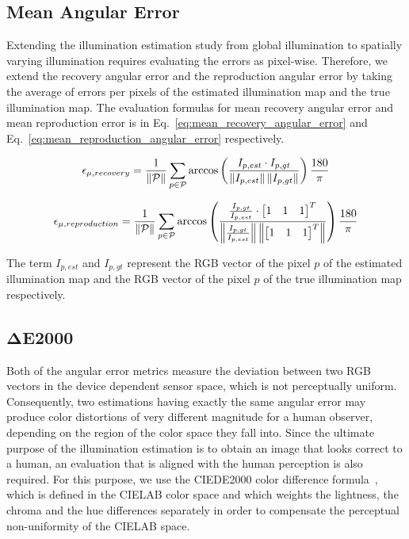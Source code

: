 \subsection{Mean Angular Error}

Extending the illumination estimation study from global illumination to spatially varying illumination requires evaluating the errors as pixel-wise. Therefore, we extend the recovery angular error and the reproduction angular error by taking the average of errors per pixels of the estimated illumination map and the true illumination map. The evaluation formulas for mean recovery angular error and mean reproduction error is in Eq.~\ref{eq:mean_recovery_angular_error} and Eq.~\ref{eq:mean_reproduction_angular_error} respectively.

\begin{equation}
    \epsilon_{\mu,recovery} = \frac{1}{\left\lVert\mathcal{P}\right\rVert}\sum_{p\in\mathcal{P}}{\arccos\left(\frac{I_{p,est} \cdot I_{p,gt}}{\left\lVert I_{p,est}\right\rVert \left\lVert I_{p,gt}\right\rVert}\right) \frac{180}{\pi}}
    \label{eq:mean_recovery_angular_error}
\end{equation}

\begin{equation}
    \epsilon_{\mu,reproduction} = \frac{1}{\left\lVert\mathcal{P}\right\rVert}\sum_{p\in\mathcal{P}}{\arccos\left(\frac{\frac{I_{p,gt}}{I_{p,est}} \cdot \begin{bmatrix} 1 & 1 & 1 \end{bmatrix}^T} {\left\lVert\frac{I_{p,gt}}{I_{p,est}}\right\rVert \left\lVert\begin{bmatrix} 1 & 1 & 1 \end{bmatrix}^T\right\rVert}\right) \frac{180}{\pi}}
    \label{eq:mean_reproduction_angular_error}
\end{equation}

The term $I_{p,est}$ and $I_{p,gt}$ represent the RGB vector of the pixel $p$ of the estimated illumination map and the RGB vector of the pixel $p$ of the true illumination map respectively.

\subsection{$\mathbf{\Delta}$E2000}
Both of the angular error metrics measure the deviation between two RGB vectors in the device dependent sensor space, which is not perceptually uniform. Consequently, two estimations having exactly the same angular error may produce color distortions of very different magnitude for a human observer, depending on the region of the color space they fall into. Since the ultimate purpose of the illumination estimation is to obtain an image that looks correct to a human, an evaluation that is aligned with the human perception is also required. For this purpose, we use the CIEDE2000 color difference formula~\cite{luoDevelopmentCIEDE2000}, which is defined in the CIELAB color space and which weights the lightness, the chroma and the hue differences separately in order to compensate the perceptual non-uniformity of the CIELAB space.


